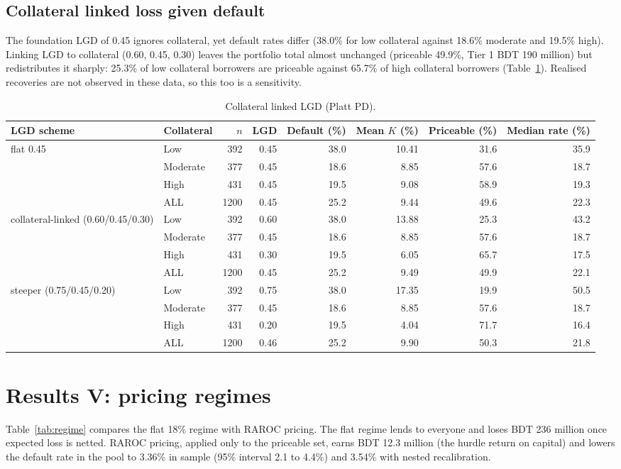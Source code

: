 \documentclass[11pt,a4paper]{article}
\newcommand{\tabsize}{\footnotesize}
\begin{document}
\subsection{Collateral linked loss given default}
The foundation LGD of 0.45 ignores collateral, yet default rates differ (38.0\% for low collateral against 18.6\% moderate and 19.5\% high). Linking LGD to collateral (0.60, 0.45, 0.30) leaves the portfolio total almost unchanged (priceable 49.9\%, Tier 1 BDT 190 million) but redistributes it sharply: 25.3\% of low collateral borrowers are priceable against 65.7\% of high collateral borrowers (Table~\ref{tab:lgd}). Realised recoveries are not observed in these data, so this too is a sensitivity.
\begin{table}[H]\centering\tabsize\setlength{\tabcolsep}{3pt}\caption{Collateral linked LGD (Platt PD).}\label{tab:lgd}
\begin{adjustbox}{max width=\textwidth}
\begin{tabular}{llrrrrrr}
\toprule
LGD scheme & Collateral & $n$ & LGD & Default (\%) & Mean $K$ (\%) & Priceable (\%) & Median rate (\%) \\
\midrule
flat 0.45 & Low & 392 & 0.45 & 38.0 & 10.41 & 31.6 & 35.9 \\
 & Moderate & 377 & 0.45 & 18.6 & 8.85 & 57.6 & 18.7 \\
 & High & 431 & 0.45 & 19.5 & 9.08 & 58.9 & 19.3 \\
 & ALL & 1200 & 0.45 & 25.2 & 9.44 & 49.6 & 22.3 \\
collateral-linked (0.60/0.45/0.30) & Low & 392 & 0.60 & 38.0 & 13.88 & 25.3 & 43.2 \\
 & Moderate & 377 & 0.45 & 18.6 & 8.85 & 57.6 & 18.7 \\
 & High & 431 & 0.30 & 19.5 & 6.05 & 65.7 & 17.5 \\
 & ALL & 1200 & 0.45 & 25.2 & 9.49 & 49.9 & 22.1 \\
steeper (0.75/0.45/0.20) & Low & 392 & 0.75 & 38.0 & 17.35 & 19.9 & 50.5 \\
 & Moderate & 377 & 0.45 & 18.6 & 8.85 & 57.6 & 18.7 \\
 & High & 431 & 0.20 & 19.5 & 4.04 & 71.7 & 16.4 \\
 & ALL & 1200 & 0.46 & 25.2 & 9.90 & 50.3 & 21.8 \\
\bottomrule
\end{tabular}
\end{adjustbox}\end{table}

\section{Results V: pricing regimes}\label{sec:regimes}
Table~\ref{tab:regime} compares the flat 18\% regime with RAROC pricing. The flat regime lends to everyone and loses BDT 236 million once expected loss is netted. RAROC pricing, applied only to the priceable set, earns BDT 12.3 million (the hurdle return on capital) and lowers the default rate in the pool to 3.36\% in sample (95\% interval 2.1 to 4.4\%) and 3.54\% with nested recalibration.
\end{document}
